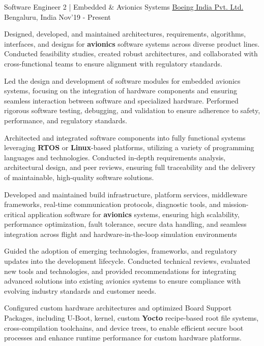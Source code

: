 \begin{cventries}
	\nopagebreak
    \cventry
	{\large Software Engineer 2 | Embedded \& Avionics Systems}
	{\href{https://www.boeing.co.in/}{\large Boeing India Pvt. Ltd.}}
	{\large Bengaluru, India}
	{\large Nov'19 - Present}
	{
		\begin{cvitems}
		\item{\large Designed, developed, and maintained architectures, requirements, algorithms, interfaces, and designs for \textbf{avionics} software systems across diverse product lines. Conducted feasibility studies, created robust architectures, and collaborated with cross-functional teams to ensure alignment with regulatory standards.}
        \item{\large Led the design and development of software modules for embedded avionics systems, focusing on the integration of hardware components and ensuring seamless interaction between software and specialized hardware. Performed rigorous software testing, debugging, and validation to ensure adherence to safety, performance, and regulatory standards.}
		\item{\large Architected and integrated software components into fully functional systems leveraging \textbf{RTOS} or \textbf{Linux}-based platforms, utilizing a variety of programming languages and technologies. Conducted in-depth requirements analysis, architectural design, and peer reviews, ensuring full traceability and the delivery of maintainable, high-quality software solutions.}
		\item{\large Developed and maintained build infrastructure, platform services, middleware frameworks, real-time communication protocols, diagnostic tools, and mission-critical application software for \textbf{avionics} systems, ensuring high scalability, performance optimization, fault tolerance, secure data handling, and seamless integration across flight and hardware-in-the-loop simulation environments}
        \item{\large Guided the adoption of emerging technologies, frameworks, and regulatory updates into the development lifecycle. Conducted technical reviews, evaluated new tools and technologies, and provided recommendations for integrating advanced solutions into existing avionics systems to ensure compliance with evolving industry standards and customer needs.}
		\item{\large Configured custom hardware architectures and optimized Board Support Packages, including U-Boot, kernel, custom \textbf{Yocto} recipe-based root file systems, cross-compilation toolchains, and device trees, to enable efficient secure boot processes and enhance runtime performance for custom hardware platforms.}

\end{cvitems}}
\end{cventries}

